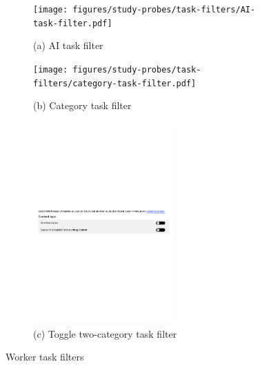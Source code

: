 \begin{figure}[htbp]
    \centering
    \begin{subfigure}[b]{0.48\textwidth}
        \centering
        \texttt{[image: figures/study-probes/task-filters/AI-task-filter.pdf]} 
        \caption{(a) AI task filter}
    \end{subfigure}
    \hfill
    \begin{subfigure}[b]{0.48\textwidth}
        \centering
        \texttt{[image: figures/study-probes/task-filters/category-task-filter.pdf]} 
        \caption{(b) Category task filter}
    \end{subfigure}
    \vspace{1em} %
    \begin{subfigure}[b]{0.98\textwidth}
        \centering
        \includegraphics[width=0.6\textwidth]{figures/study-probes/task-filters/toggle-task-filter.pdf}
        \caption{(c) Toggle two-category task filter}
    \end{subfigure}
    \caption{Worker task filters}
    \label{fig:worker-task-filters}
\end{figure}

